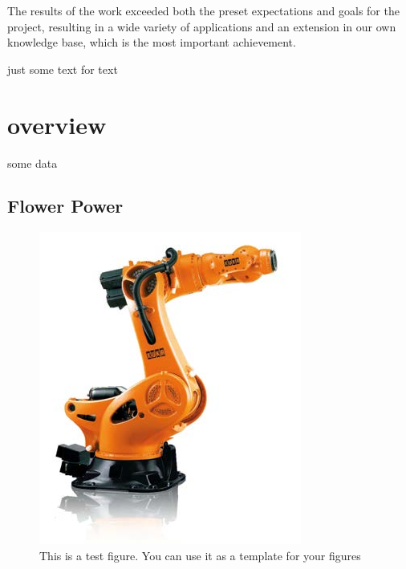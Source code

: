 The results of the work exceeded both the preset expectations and goals for the project, resulting in a wide variety of applications and an extension in our own knowledge base, which is the most important achievement. 



just some text for text
\section{overview}
some data
\subsection{Flower Power}

\begin{figure}[h]
    \centering
    \includegraphics[width=0.7\linewidth]{figures/kuka}
    \caption[test Fig]{This is a test figure. You can use it as a template for your figures}
    \label{fig:kuka}
\end{figure}
